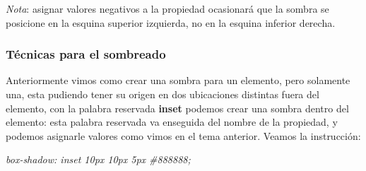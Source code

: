 \textit{Nota}: asignar valores negativos a la propiedad ocasionará que la sombra se posicione en la esquina superior izquierda, no en la esquina inferior derecha.


\subsubsection{Técnicas para el sombreado}

Anteriormente vimos como crear una sombra para un elemento, pero solamente una, esta pudiendo tener su origen en dos ubicaciones distintas fuera del elemento, con la palabra reservada \textbf{inset} podemos crear una sombra dentro del elemento: esta palabra reservada va enseguida del nombre de la propiedad, y podemos asignarle valores como vimos en el tema anterior. Veamos la instrucción:
\begin{center}
    \textit{box-shadow: inset 10px 10px 5px \#888888;}
\end{center}

